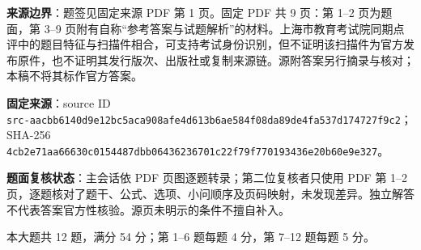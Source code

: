 

\begin{gktip}
\textbf{来源边界}：题签见固定来源 PDF 第 1 页。固定 PDF 共 9 页：第 1–2 页为题面，第 3–9 页附有自称“参考答案与试题解析”的材料。上海市教育考试院同期点评中的题目特征与扫描件相合，可支持考试身份识别，但不证明该扫描件为官方发布原件，也不证明其发行版次、出版社或复制来源链。源附答案另行摘录与核对；本稿不将其标作官方答案。

\textbf{固定来源}：source ID\\
\texttt{src-aacbb6140d9e12bc5aca908afe4d613b6ae584f08da89de4fa537d174727f9c2}；SHA-256\\
\texttt{4cb2e71aa66630c0154487dbb06436236701c22f79f770193436e20b60e9e327}。

\textbf{题面复核状态}：主会话依 PDF 页图逐题转录；第二位复核者只使用 PDF 第 1–2 页，逐题核对了题干、公式、选项、小问顺序及页码映射，未发现差异。独立解答不代表答案官方性核验。源页未明示的条件不擅自补入。
\end{gktip}


\begin{gktip}
本大题共 12 题，满分 54 分；第 1–6 题每题 4 分，第 7–12 题每题 5 分。
\end{gktip}

